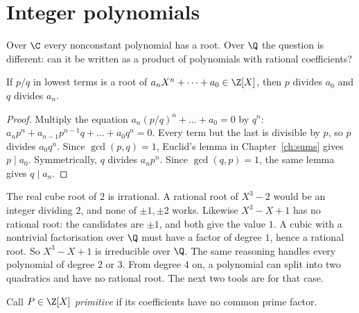 \section{Integer polynomials}

Over $\C$ every nonconstant polynomial has a root. Over $\Q$ the question is different: can it be written as a product of polynomials with rational coefficients?

\begin{proposition}\label{prop:ratroot}
If $p/q$ in lowest terms is a root of $a_nX^n+\dots+a_0\in\Z[X]$, then $p$ divides $a_0$ and $q$ divides $a_n$.
\end{proposition}
\begin{proof}
Multiply the equation $a_n(p/q)^n+\dots+a_0=0$ by $q^n$: $a_np^n+a_{n-1}p^{n-1}q+\dots+a_0q^n=0$. Every term but the last is divisible by $p$, so $p$ divides $a_0q^n$. Since $\gcd(p,q)=1$, Euclid's lemma in Chapter~\ref{ch:sums} gives $p\mid a_0$. Symmetrically, $q$ divides $a_np^n$. Since $\gcd(q,p)=1$, the same lemma gives $q\mid a_n$.
\end{proof}

\begin{examplex}
The real cube root of $2$ is irrational. A rational root of $X^3-2$ would be an integer dividing $2$, and none of $\pm1,\pm2$ works. Likewise $X^3-X+1$ has no rational root: the candidates are $\pm1$, and both give the value $1$. A cubic with a nontrivial factorisation over $\Q$ must have a factor of degree $1$, hence a rational root. So $X^3-X+1$ is irreducible over $\Q$. The same reasoning handles every polynomial of degree $2$ or $3$. From degree $4$ on, a polynomial can split into two quadratics and have no rational root. The next two tools are for that case.
\end{examplex}

Call $P\in\Z[X]$ \emph{primitive} if its coefficients have no common prime factor.


